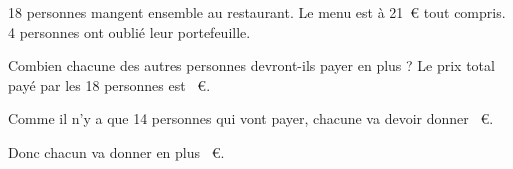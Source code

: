 18 personnes mangent ensemble au restaurant. Le menu est à
21~\textgreek{\euro} tout compris.\\4 personnes ont oublié leur
portefeuille.
\par Combien chacune des autres personnes devront-ils payer en plus ?
Le prix total payé par les 18 personnes est
~\textgreek{\euro}.\hfill{}
\par Comme il n'y a que 14 personnes qui vont payer, chacune va devoir
donner
~\textgreek{\euro}.\hfill{}
\par Donc chacun va donner en plus ~\textgreek{\euro}.\hfill{}